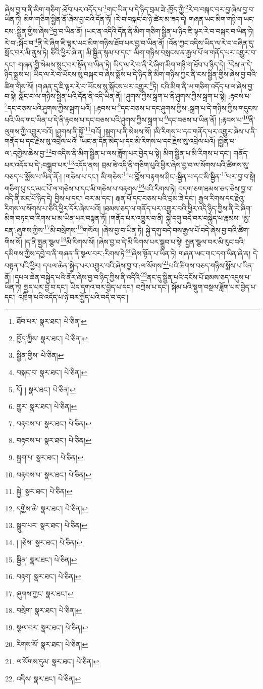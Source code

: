 ཞེས་བྱ་བ་ནི་མིག་གཅིག་:ཐོབ་པར་འདོད་པ་\footnote{ཐོབ་པར་  སྣར་ཐང་།  པེ་ཅིན། }གང་ཡིན་པ་དེ་ཉིད་བྲམ་ཟེ་:ཁྱོད་ཀྱི་\footnote{ཁྱོད་ཀྱིས་  སྣར་ཐང་།  པེ་ཅིན། }རེ་བ་བསྐང་བར་བྱ་ཞེས་བྱ་བ་ཡིན་ཏེ། མིག་གཅིག་སྦྱིན་ནོ་ཞེས་བྱ་བའི་དོན་ཏོ། །རེ་བ་བསྐང་བ་ཉི་ཚེར་མ་ཟད་དེ། གཞན་ཡང་མིག་གཉི་ག་ཡང་ངས་:སྦྱིན་གྱིས་ཞེས་\footnote{སྦྱིན་གྱིས་  པེ་ཅིན། }བྱ་བ་ཡིན་ནོ། །ཡང་ན་འདིའི་དོན་ནི་མིག་གཅིག་སྦྱིན་པ་ཉིད་ཇི་ལྟར་རེ་བ་བསྐང་བ་ཡིན་ཏེ། རེ་བ་:སྐོང་བ་\footnote{བསྐང་བ་  སྣར་ཐང་།  པེ་ཅིན། }ནི་རེ་ཞིག་ཇི་ལྟར་ཡང་མིག་གཉིས་ཐོབ་པར་བྱ་བ་ཡིན་ནོ། །འོན་ཀྱང་འདིས་ཡིད་ལ་རེ་བ་བཞིན་དུ་སློང་བར་མི་ནུས་ཏེ། ཅིའི་ཕྱིར་ཞེ་ན། མི་སྦྱིན་སྙམ་པ་དང་། མིག་གཉིས་བསླངས་ན་རྒྱལ་པོ་ལ་གནོད་པར་འགྱུར་བ་དང་། གཞན་གྱི་སེམས་སྲུང་བར་སྟོན་པ་ཡིན་ཏེ། ཡིད་ལ་རེ་བ་ནི་རེ་ཞིག་མིག་གཉི་ག་ཐོབ་པ་ཉིད་དེ། \footnote{དོ། །   སྣར་ཐང་།  པེ་ཅིན། }དེས་ན་དེ་ཉིད་སྨྲས་པ། ཡིད་ལ་རེ་བ་ཡོངས་སུ་བསྐང་བ་ཞེས་སྨོས་པ་དེ་ཉིད་ནི་མིག་གཉིས་ཀྱང་ནི་ངས་སྦྱིན་གྱིས་ཞེས་བྱ་བའི་ཚིག་གིས་སོ། །གཞན་དུ་ཇི་ལྟར་རེ་བ་ཡོངས་སུ་སྐོངས་པར་འགྱུར་\footnote{གྱུར་  སྣར་ཐང་།  པེ་ཅིན། }ཏེ། ངའི་མིག་ནི་ཡ་གཅིག་འདོད་པ་ལ་ཞེས་བྱ་བ་སྟེ། སློང་བ་ལ་གཉིས་སྦྱིན་པའི་དོན་ནི་འདི་ཡིན་ནོ། །ཤུགས་ཀྱིས་སྐྲག་པ་ནི་ཤུགས་ཀྱིས་སྐྲག་པ་སྟེ། :རྟབས་པ་\footnote{བརྟབས་པ་  སྣར་ཐང་།  པེ་ཅིན། }དང་བཅས་པའི་ཤུགས་ཀྱིས་སྐྲག་པའོ། །:རྟབས་པ་\footnote{བརྟབས་པ་  སྣར་ཐང་།  པེ་ཅིན། }དང་བཅས་པ་དང་ཤུགས་ཀྱིས་:སྐྲག་པ་དེ་གཉིས་ཀྱིས་གདུངས་པའི་ཡིད་གང་ཡིན་པ་དེ་ནི་རྟབས་པ་དང་བཅས་པའི་ཤུགས་ཀྱིས་སྐྲག་པ་\footnote{སྐྲག་པ་  སྣར་ཐང་།  པེ་ཅིན། }དང་བཅས་པ་ཡིན་ནོ། །:རྟབས་པ་\footnote{བརྟབས་པ་  སྣར་ཐང་།  པེ་ཅིན། }ནི་ལུགས་ཀྱི་འགྱུར་བའོ། །ཤུགས་ནི་སྐྱོ་\footnote{སྐྱེ་  སྣར་ཐང་།  པེ་ཅིན། }བའོ། །སྐྲག་པ་ནི་སེམས་སོ། །མི་རིགས་པ་དང་གནོད་པར་འགྱུར་ཞེས་པ་ནི་གནོད་པ་དང་རྗེས་སུ་འབྲེལ་པའོ། །ཡང་ན་དོན་མེད་པ་དང་མི་རིགས་པ་དང་རྗེས་སུ་འབྲེལ་པའོ། །སྦྱིན་པ་ལ་:དགྱེས་ཆེས་བྱ་\footnote{དགྱེས་ཆེ་  སྣར་ཐང་།  པེ་ཅིན། }བ་འདིས་ནི་མིག་སྦྱིན་པ་ལས་ཟློག་པར་བྱེད་པ་སྟེ། མིག་སྦྱིན་པ་མི་རིགས་པ་དང་། གནོད་པར་འདོད་པ་དེ་:བསྒྲུབ་པར་\footnote{སྒྲུབ་པར་  སྣར་ཐང་།  པེ་ཅིན། }འདོད་ནས། བྲམ་ཟེ་འདི་ནི་གཅིག་པུའི་ཕྱིར་ཞེས་བྱ་བ་ལ་སོགས་པའི་ཚིགས་སུ་བཅད་པ་སྨོས་པ་ཡིན་ནོ:། །གཅེས་པ་དང་། མི་གཅེས་\footnote{། །ཅེས་  སྣར་ཐང་།  པེ་ཅིན། }པ་བློས་བརྟགས་ཤིང་:སྦྱིན་པ་དང་མི་སྦྱིན་\footnote{སྦྱིན་  སྣར་ཐང་།  པེ་ཅིན། }པར་བྱ་བ་སྟེ། གཅིག་པུ་དང་མང་པོ་ལ་གཅེས་པ་དང་མི་གཅེས་པ་བརྟགས་\footnote{བརྟག་  སྣར་ཐང་།  པེ་ཅིན། }པའི་རིགས་ཏེ། བདག་ཅག་ཐམས་ཅད་ཅེས་བྱ་བ་འདི་ནི་མང་པོ་ཉིད་དེ། བྱིས་པ་དང་། བར་མ་དང་། རྒན་པོ་དང་བཅས་པའི་བྲམ་ཟེ་དང་། རྒྱལ་རིགས་དང་རྗེའུ་རིགས་ལ་སོགས་པ་ཅིའི་ཕྱིར་དོར་ཞེས་པའོ། །ཐམས་ཅད་ལ་གནོད་པར་འགྱུར་བའི་ཕྱིར་འདི་ཉིད་ཀྱིས་ནི་རེ་ཞིག་མིག་བཏང་བ་རིགས་པ་མ་ཡིན་པར་བསྟན་ཏོ། །གནོད་པར་འགྱུར་བ་ནི། སྐྱེ་དགུ་བདེ་བར་བསྐྱེད་པ་རྣམས། །མྱ་ངན་:ཞུགས་ཀྱིས་\footnote{ཞུགས་ཀྱང་  སྣར་ཐང་། }མི་བསྲེགས་\footnote{བསྲེག་  སྣར་ཐང་།  པེ་ཅིན། }གསོལ། །ཞེས་བྱ་བ་ཡིན་ཏེ། སྐྱེ་དགུ་བདེ་བས་རྒྱལ་པོ་བདེ་ཞེས་བྱ་བའི་ཚིག་གིས་སོ། །ད་ནི་སྤྱན་སྩལ་\footnote{སྩལ་བར་  སྣར་ཐང་།  པེ་ཅིན། }མི་རིགས་སོ། །ཞེས་བྱ་བ་དེ་མི་རིགས་པར་སྒྲུབ་པ་སྟེ། སྤྱན་སྩལ་བར་མི་རུང་བའི་དམིགས་ཀྱིས་དབྱེ་བ་ནི་གཞན་ནི་སྩལ་བར་:རིགས་ཏེ་\footnote{རིགས་སོ་  སྣར་ཐང་།  པེ་ཅིན། }ཞེས་སྟོན་པ་ཡིན་ཏེ། གཞན་ཡང་གང་དག་ཡིན་ཞེ་ན། དེ་བསྟན་པའི་ཕྱིར། དཔལ་ཆེན་སྐྱེད་པར་འགྱུར་བའི་ཞེས་བྱ་བ་:ལ་སོགས་\footnote{ལ་སོགས་དུམ་  སྣར་ཐང་།  པེ་ཅིན། }པའི་ཚིགས་བཅད་གཉིས་སྨོས་པ་ཡིན་ནོ། །དཔལ་ཆེན་བསྐྱེད་པའི་ནོར་ཞེས་བྱ་བ་ཉིད་ཀྱིས་ནི་འདིའི་\footnote{འདིས་  སྣར་ཐང་།  པེ་ཅིན། }ནང་དུ་སྦྱིན་པའི་དངོས་པོ་ཐམས་ཅད་འདུས་པ་ཡིན་ཏེ། སྤྱད་པར་བྱ་བ་དང་། ཡིད་དགའ་བར་བྱེད་པ་དང་། བཀྲེས་པ་དང་། སྐོམ་པའི་སྡུག་བསྔལ་ཟློག་པར་བྱེད་པ་དང་། འཁྲིག་པའི་འདོད་པ་ཉེ་བར་སྤྱོད་པའི་བདེ་བ་དང་། 